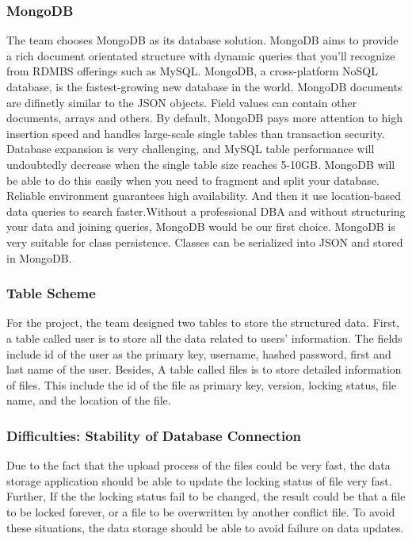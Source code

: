 \documentclass{article}
\begin{document}
\subsubsection{MongoDB}

The team chooses MongoDB as its database solution. MongoDB aims to provide a rich document orientated structure with dynamic queries that you'll recognize from RDMBS offerings such as MySQL. MongoDB, a cross-platform NoSQL database, is the fastest-growing new database in the world. MongoDB documents are difinetly similar to the JSON objects. Field values can contain other documents, arrays and others.
\cite{c9}\newline 
By default, MongoDB pays more attention to high insertion speed and handles large-scale single tables than transaction security. Database expansion is very challenging, and MySQL table performance will undoubtedly decrease when the single table size reaches 5-10GB. MongoDB will be able to do this easily when you need to fragment and split your database. Reliable environment guarantees high availability. And then it use location-based data queries to search faster.Without a professional DBA and without structuring your data and joining queries, MongoDB would be our first choice. MongoDB is very suitable for class persistence. Classes can be serialized into JSON and stored in MongoDB.


\subsubsection{Table Scheme}

For the project, the team designed two tables to store the structured data. First, a table called user is to store all the data related to users' information. The fields include id of the user as the primary key, username, hashed password, first and last name of the user. Besides, A table called files is to store detailed information of files. This include the id of the file as primary key, version, locking status, file name, and the location of the file.

\subsubsection{Difficulties: Stability of Database Connection }

Due to the fact that the upload process of the files could be very fast, the data storage application should be able to update the locking status of file very fast. Further, If the the locking status fail to be changed, the result could be that a file to be locked forever, or a file to be overwritten by another conflict file. To avoid these situations, the data storage should be able to avoid failure on data updates. 
\end{document}
